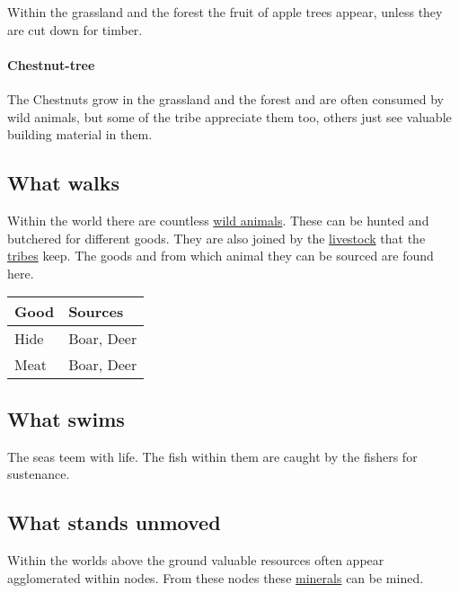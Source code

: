 Within the grassland and the forest the fruit of apple trees appear, unless
they are cut down for timber.

\paragraph{Chestnut-tree}

The Chestnuts grow in the grassland and the forest and are often consumed by
wild animals, but some of the tribe appreciate them too, others just see
valuable building material in them.

\subsection{What walks}\label{ch:Goods:Nature:Animals}

Within the world there are countless
\hyperref[ch:World:Inhabitants:Animals]{wild animals}. These can be hunted and
butchered for different goods. They are also joined by the
\hyperref[ch:World:Inhabitants:Livestock]{livestock} that the
\hyperref[ch:Tribes]{tribes} keep. The goods and from which animal they can be
sourced are found here.

\begin{longtable}{ll}
	\toprule
	Good       & Sources                \\
	\midrule
	\Gls{Hide} & \Gls{Boar}, \gls{Deer} \\
	\Gls{Meat} & \Gls{Boar}, \gls{Deer} \\
	\bottomrule
\end{longtable}

\subsection{What swims}\label{ch:Goods:Nature:Sea}

The seas teem with life. The fish within them are caught by the fishers for
sustenance.

\subsection{What stands unmoved}\label{ch:Goods:Nature:Minerals}

Within the worlds above the ground valuable resources often appear agglomerated
within nodes. From these nodes these \hyperref[ch:World:Minerals]{minerals} can
be mined.

\paragraph{}

